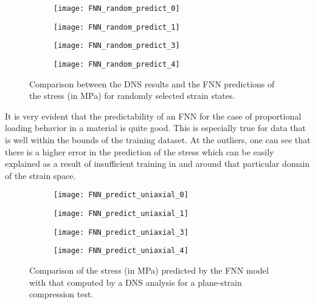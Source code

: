 \begin{figure}
	\centering
	\begin{subfigure}[t]{0.45\textwidth}
		\texttt{[image: FNN\_random\_predict\_0]}
	\end{subfigure}
	\begin{subfigure}[t]{0.45\textwidth}
	\texttt{[image: FNN\_random\_predict\_1]}
	\end{subfigure}
	\begin{subfigure}[t]{0.45\textwidth}
	\texttt{[image: FNN\_random\_predict\_3]}
	\end{subfigure}
	\begin{subfigure}[t]{0.45\textwidth}
	\texttt{[image: FNN\_random\_predict\_4]}
	\end{subfigure}
	\caption{Comparison between the DNS results and the FNN predictions of the stress (in MPa) for randomly selected strain states.}\label{fig-nn-fnn4}
\end{figure}

It is very evident that the predictability of an FNN for the case of proportional loading behavior in a material is quite good. This is especially true for data that is well within the bounds of the training dataset. At the outliers, one can see that there is a higher error in the prediction of the stress which can be easily explained as a result of insufficient training in and around that particular domain of the strain space.

\begin{figure}
	\centering
	\begin{subfigure}[t]{0.45\textwidth}
		\texttt{[image: FNN\_predict\_uniaxial\_0]}
	\end{subfigure}
	\begin{subfigure}[t]{0.45\textwidth}
		\texttt{[image: FNN\_predict\_uniaxial\_1]}
	\end{subfigure}
	\begin{subfigure}[t]{0.45\textwidth}
		\texttt{[image: FNN\_predict\_uniaxial\_3]}
	\end{subfigure}
	\begin{subfigure}[t]{0.45\textwidth}
		\texttt{[image: FNN\_predict\_uniaxial\_4]}
	\end{subfigure}
	\caption{Comparison of the stress (in MPa) predicted by the FNN model with that computed by a DNS analysis for a plane-strain compression test.}\label{fig-nn-fnn5-1}
\end{figure}

